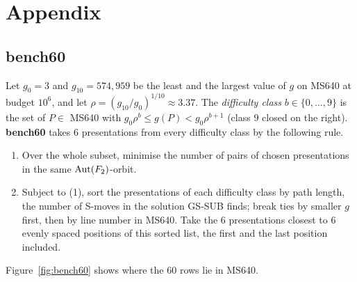 \section*{Appendix}\label{sec:appendix}
\setcounter{subsection}{0}
\renewcommand{\thesubsection}{\Alph{subsection}}

\subsection{bench60}\label{app:bench60}

\begin{definition}\label{def:bench60full}
Let $g_0=3$ and $g_{10}=574{,}959$ be the least and the largest value of $g$ on MS640 at budget $10^6$, and
let $\rho=(g_{10}/g_0)^{1/10}\approx3.37$. The \emph{difficulty class} $b\in\{0,\dots,9\}$ is the set of $P\in$ MS640 with
$g_0\rho^{b}\le g(P)<g_0\rho^{b+1}$ (class $9$ closed on the right). \textbf{bench60} takes $6$ presentations from every
difficulty class by the following rule.
\begin{enumerate}
  \item Over the whole subset, minimise the number of pairs of chosen presentations in the same $\operatorname{Aut}(F_2)$-orbit.
  \item Subject to (1), sort the presentations of each difficulty class by path length, the number of S-moves in the solution GS-SUB finds; break ties by smaller $g$ first, then by line number in MS640.
  Take the $6$ presentations closest to $6$ evenly spaced positions of this sorted list, the first and the last
  position included.
\end{enumerate}
\end{definition}

Figure~\ref{fig:bench60} shows where the $60$ rows lie in MS640.

